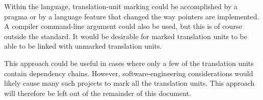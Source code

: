 Within the language, translation-unit marking could be accomplished by
a pragma or by a language feature that changed the way pointers are
implemented.
A compiler command-line argument could also be used, but this is of
course outside the standard.
It would be desirable for marked translation units to be able to
be linked with unmarked translation units.

This approach could be useful in cases where only a few of the translation
units contain dependency chains.
However, software-engineering considerations would likely cause many such
projects to mark all the translation units.
This approach will therefore be left out of the remainder of this document.
